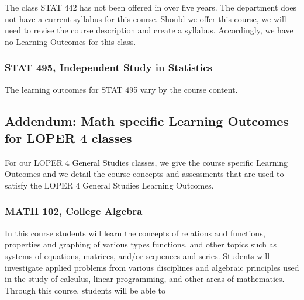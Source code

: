 \documentclass[11pt]{article}
\begin{document}
The class STAT 442 has not been offered in over five years. The
department does not have a current syllabus for this course. Should we offer this course,  we will need to revise
the course description and create a syllabus. Accordingly, we have no Learning Outcomes for this class.

\subsubsection{STAT 495, Independent Study in Statistics}

The learning outcomes for STAT 495 vary by the course content.



\subsection{\textbf{Addendum:} Math specific Learning Outcomes for LOPER 4 classes}

For our LOPER 4 General Studies classes, we give the course specific 
Learning Outcomes and we detail the course concepts and assessments that are
used to satisfy the LOPER 4 General Studies Learning Outcomes.

\subsubsection{MATH 102, College Algebra} 

In this course students will learn the concepts of relations and 
functions, properties and graphing of various types functions, and other topics such 
as systems of equations, matrices, and/or sequences and series. Students will 
investigate applied problems from various disciplines and 
algebraic principles used in the study of calculus, linear programming, and other 
areas of mathematics. Through this course, students will be able to
\end{document}
